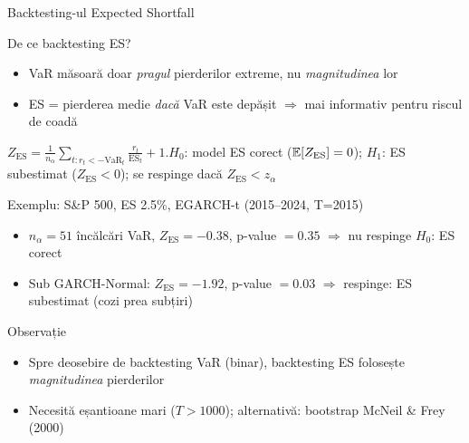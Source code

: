 \documentclass[9pt, aspectratio=169, t]{beamer}
\begin{document}
\begin{frame}{Backtesting-ul Expected Shortfall}
    \small
        \setlength{\abovedisplayskip}{1pt}\setlength{\belowdisplayskip}{1pt}
        \vspace{-0.4cm}
        \begin{block}{De ce backtesting ES?}
            \begin{itemize}
                \item VaR măsoară doar \textit{pragul} pierderilor extreme, nu \textit{magnitudinea} lor
                \item ES = pierderea medie \textit{dacă} VaR este depășit $\Rightarrow$ mai informativ pentru riscul de coadă
            \end{itemize}
        \end{block}
        \vspace{-0.25cm}
        \begin{defn}
            $Z_{\text{ES}} = \frac{1}{n_\alpha} \sum_{t: r_t < -\text{VaR}_t} \frac{r_t}{\text{ES}_t} + 1$.\quad $H_0$: model ES corect ($\mathbb{E}[Z_{\text{ES}}] = 0$); $H_1$: ES subestimat ($Z_{\text{ES}} < 0$); se respinge dacă $Z_{\text{ES}} < z_{\alpha}$
        \end{defn}
        \vspace{-1.5mm}
        \begin{exampleblock}{Exemplu: S\&P 500, ES 2.5\%, EGARCH-t (2015--2024, T=2015)}
            \begin{itemize}
                \item $n_\alpha = 51$ încălcări VaR, $Z_{\text{ES}} = -0.38$, p-value $= 0.35$ $\Rightarrow$ nu respinge $H_0$: ES corect
                \item Sub GARCH-Normal: $Z_{\text{ES}} = -1.92$, p-value $= 0.03$ $\Rightarrow$ respinge: ES subestimat (cozi prea subțiri)
            \end{itemize}
        \end{exampleblock}
        \vspace{-1.5mm}
        \begin{alertblock}{Observație}
            \begin{itemize}
                \item Spre deosebire de backtesting VaR (binar), backtesting ES folosește \textit{magnitudinea} pierderilor
                \item Necesită eșantioane mari ($T > 1000$); alternativă: bootstrap McNeil \& Frey (2000)
            \end{itemize}
        \end{alertblock}
\end{frame}
\end{document}
